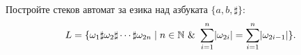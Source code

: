 \begin{problem}
  Постройте стеков автомат за езика над азбуката $\{a,b,\sharp\}$:
  \[L = \{\omega_1 \sharp \omega_2 \sharp \cdots \sharp \omega_{2n} \mid n\in\Nat\ \&\ \sum^n_{i=1}\abs{\omega_{2i}} = \sum^{n}_{i=1}\abs{\omega_{2i-1}}\}.\]
\end{problem}


